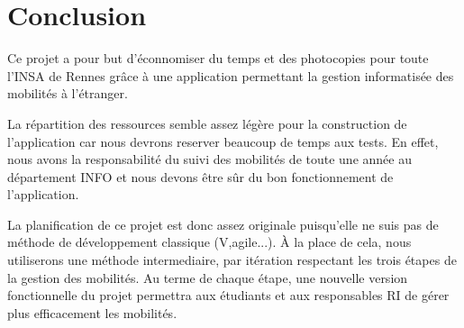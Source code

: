 \chapter*{Conclusion}

Ce projet a pour but d'éconnomiser du temps et des photocopies pour toute l'INSA de Rennes grâce à une application permettant la gestion informatisée des mobilités à l'étranger.

\bigbreak

La répartition des ressources semble assez légère pour la construction de l'application car nous devrons reserver beaucoup de temps aux tests. En effet, nous avons la responsabilité du suivi des mobilités de toute une année au département INFO et nous devons être sûr du bon fonctionnement de l'application.

\bigbreak

La planification de ce projet est donc assez originale puisqu'elle ne suis pas de méthode de développement classique (V,agile...). À la place de cela, nous utiliserons une méthode intermediaire, par itération respectant les trois étapes de la gestion des mobilités. Au terme de chaque étape, une nouvelle version fonctionnelle du projet permettra aux étudiants et aux responsables RI de gérer plus efficacement les mobilités. 
